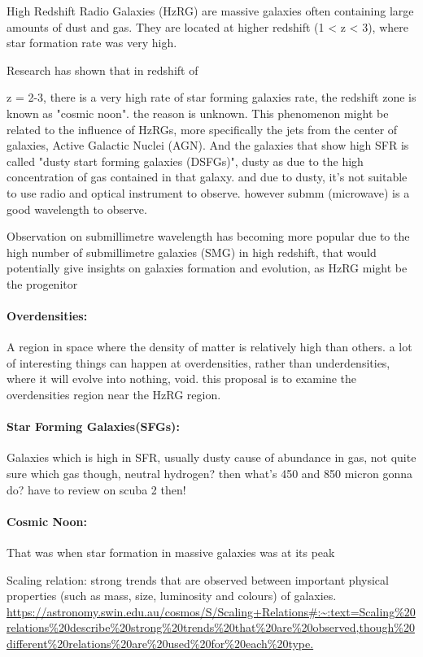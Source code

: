 \documentclass{article}
\begin{document}
High Redshift Radio Galaxies (HzRG) are massive galaxies often containing large amounts of dust and gas. They are located at higher redshift (1 < z < 3), where star formation rate was very high.
\medskip

\noindent Research has shown that in redshift of {z = 2-3, there is a very high rate of star forming galaxies rate, the redshift zone is known as "cosmic noon". the reason is unknown. This phenomenon might be related to the influence of HzRGs, more specifically the jets from the center of galaxies, Active Galactic Nuclei (AGN). And the galaxies that show high SFR is called "dusty start forming galaxies (DSFGs)", dusty as due to the high concentration of gas contained in that galaxy. and due to dusty, it's not suitable to use radio and optical instrument to observe. however submm (microwave) is a good wavelength to observe.
\medskip

\noindent Observation on submillimetre wavelength has becoming more popular due to the high number of submillimetre galaxies (SMG) in high redshift, that would potentially give insights on galaxies formation and evolution, as HzRG might be the progenitor 

\paragraph{Overdensities:}A region in space where the density of matter is relatively high than others. a lot of interesting things can happen at overdensities, rather than underdensities, where it will evolve into nothing, void. this proposal is to examine the overdensities region near the HzRG region.

\paragraph{Star Forming Galaxies(SFGs):} Galaxies which is high in SFR, usually dusty cause of abundance in gas, not quite sure which gas though, neutral hydrogen?
then what's 450 and 850 micron gonna do? have to review on scuba 2 then!

\paragraph{Cosmic Noon:}
That was when star formation in massive galaxies was at its peak

Scaling relation:
strong trends that are observed between important physical properties (such as mass, size, luminosity and colours) of galaxies. 
\url{https://astronomy.swin.edu.au/cosmos/S/Scaling+Relations#:~:text=Scaling%20relations%20describe%20strong%20trends%20that%20are%20observed,though%20different%20relations%20are%20used%20for%20each%20type.}

}
\end{document}
